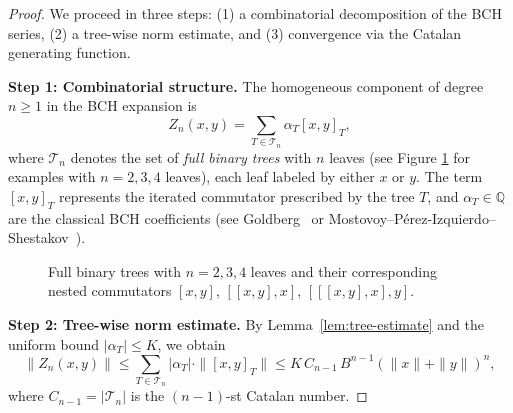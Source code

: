 \documentclass[11pt]{amsart}
\numberwithin{equation}{section}
\theoremstyle{remark}
\begin{document}
\begin{proof}
We proceed in three steps: (1) a combinatorial decomposition of the BCH series, (2) a tree-wise norm estimate, and (3) convergence via the Catalan generating function.

\medskip

\noindent\textbf{Step 1: Combinatorial structure.}
The homogeneous component of degree $n \geq 1$ in the BCH expansion is
\[
Z_n(x, y) = \sum_{T \in \mathcal{T}_n} \alpha_T [x, y]_T,
\]
where $\mathcal{T}_n$ denotes the set of \emph{full binary trees} with $n$ leaves 
(see Figure \ref{fig:binary-trees} for examples with 
$n = 2, 3, 4$ leaves), 
each leaf labeled by either $x$ or $y$. The term $[x, y]_T$ represents the iterated commutator prescribed by the tree $T$, and $\alpha_T \in \mathbb{Q}$ are the classical BCH coefficients (see Goldberg~\cite{Goldberg1956} or Mostovoy–Pérez-Izquierdo–Shestakov~\cite{Mostovoy2016}).

\medskip
\begin{figure}[ht]
\centering
{}
\quad
{}
\quad
{}
\caption{Full binary trees with $n=2,3,4$ leaves and their corresponding nested commutators $[x,y]$, $[[x,y],x]$, $[[[x,y],x],y]$.}
\label{fig:binary-trees}
\end{figure}

\noindent\textbf{Step 2: Tree-wise norm estimate.}
By Lemma~\ref{lem:tree-estimate} and the uniform bound $|\alpha_T| \leq K$, we obtain
\[
\|Z_n(x, y)\| \leq \sum_{T \in \mathcal{T}_n} |\alpha_T| \cdot \|[x, y]_T\| \leq K \, C_{n-1} \, B^{n-1} (\|x\| + \|y\|)^n,
\]
where $C_{n-1} = |\mathcal{T}_n|$ is the $(n-1)$-st Catalan number.


\end{proof}
\end{document}
